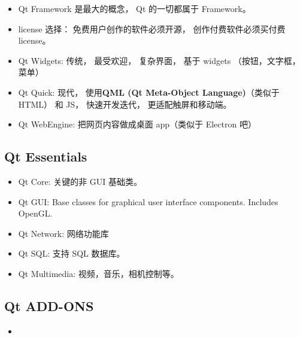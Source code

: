
\begin{issues}
\issueDraft
\end{issues}

\begin{itemize}
\item Qt Framework 是最大的概念， Qt 的一切都属于 Framework。
\item license 选择： 免费用户创作的软件必须开源， 创作付费软件必须买付费 license。
\item Qt Widgets: 传统， 最受欢迎， 复杂界面， 基于 widgets （按钮，文字框，菜单）
\item Qt Quick: 现代， 使用\textbf{QML (Qt Meta-Object Language)}（类似于 HTML） 和 JS， 快速开发迭代， 更适配触屏和移动端。
\item Qt WebEngine: 把网页内容做成桌面 app（类似于 Electron 吧）
\end{itemize}


\subsection{Qt Essentials}
\begin{itemize}
\item Qt Core: 关键的非 GUI 基础类。
\item Qt GUI: Base classes for graphical user interface components. Includes OpenGL.
\item Qt Network: 网络功能库
\item Qt SQL: 支持 SQL 数据库。
\item Qt Multimedia: 视频，音乐，相机控制等。
\end{itemize}

\subsection{Qt ADD-ONS}
\begin{itemize}
\item 
\end{itemize}

